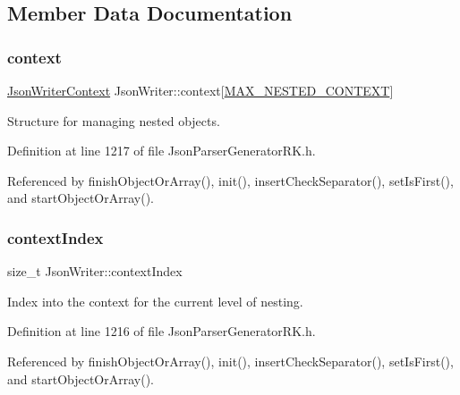 \subsection{Member Data Documentation}
\mbox{\label{class_json_writer_a2311bf4f11136f55acd23fb13b4b1344}} 
\subsubsection{\texorpdfstring{context}{context}}
{\footnotesize\ttfamily \hyperlink{struct_json_writer_context}{Json\+Writer\+Context} Json\+Writer\+::context\mbox{[}\hyperlink{class_json_writer_a7d1daa126e962c611373f65d1e83e4ee}{M\+A\+X\+\_\+\+N\+E\+S\+T\+E\+D\+\_\+\+C\+O\+N\+T\+E\+XT}\mbox{]}\hspace{0.3cm}{\ttfamily [protected]}}



Structure for managing nested objects. 



Definition at line 1217 of file Json\+Parser\+Generator\+R\+K.\+h.



Referenced by finish\+Object\+Or\+Array(), init(), insert\+Check\+Separator(), set\+Is\+First(), and start\+Object\+Or\+Array().

\mbox{\label{class_json_writer_a28554227000e3a49b446e5db77f0505e}} 
\subsubsection{\texorpdfstring{context\+Index}{contextIndex}}
{\footnotesize\ttfamily size\+\_\+t Json\+Writer\+::context\+Index\hspace{0.3cm}{\ttfamily [protected]}}



Index into the context for the current level of nesting. 



Definition at line 1216 of file Json\+Parser\+Generator\+R\+K.\+h.



Referenced by finish\+Object\+Or\+Array(), init(), insert\+Check\+Separator(), set\+Is\+First(), and start\+Object\+Or\+Array().

